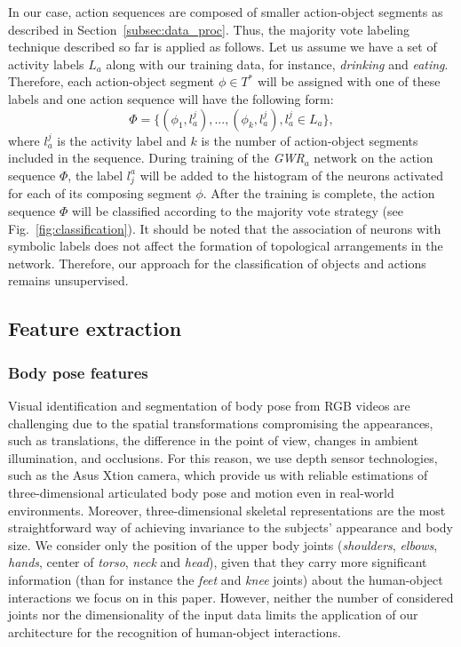 \documentclass[5p,times]{elsarticle}
\begin{document}
In our case, action sequences are composed of smaller action-object segments as described in Section~\ref{subsec:data_proc}.
Thus, the majority vote labeling technique described so far is applied as follows.
Let us assume we have a set of activity labels $L_a$ along with our training data, for instance, \textit{drinking} and \textit{eating}.
Therefore, each action-object segment $\phi \in T^*$ will be assigned with one of these labels and one action sequence will have the following form:
\begin{equation}
\Phi = \{ (\phi_1, l^j_a),...,(\phi_k, l^j_a), l^j_a \in L_a \},
\end{equation}
where $l^j_a$ is the activity label and $k$ is the number of action-object segments included in the sequence. 
During training of the \textit{GWR}$_a$ network on the action sequence $\Phi$, the label $l^a_j$ will be added to the histogram of the neurons activated for each of its composing segment $\phi$.
After the training is complete, the action sequence $\Phi$ will be classified according to the majority vote strategy (see Fig.~\ref{fig:classification}).
It should be noted that the association of neurons with symbolic labels does not affect the formation of topological arrangements in the network.
Therefore, our approach for the classification of objects and actions remains unsupervised.

\subsection{Feature extraction}\label{subsec:features}
\subsubsection{Body pose features}
Visual identification and segmentation of body pose from RGB videos are challenging due to the spatial transformations compromising the appearances, such as translations, the difference in the point of view, changes in ambient illumination, and occlusions.
For this reason, we use depth sensor technologies, such as the Asus Xtion camera, which provide us with reliable estimations of three-dimensional articulated body pose and motion even in real-world environments. 
Moreover, three-dimensional skeletal representations are the most straightforward way of achieving invariance to the subjects' appearance and body size.
We consider only the position of the upper body joints (\textit{shoulders}, \textit{elbows}, \textit{hands}, center of \textit{torso}, \textit{neck} and \textit{head}), given that they carry more significant information (than for instance the \textit{feet} and \textit{knee} joints) about the human-object interactions we focus on in this paper.
However, neither the number of considered joints nor the dimensionality of the input data limits the application of our architecture for the recognition of human-object interactions.
\end{document}
